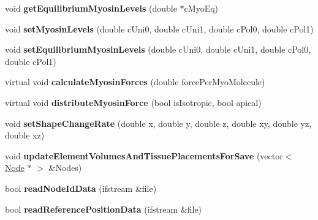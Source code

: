 \begin{DoxyCompactItemize}
\item 
\hypertarget{classShapeBase_ab31ad5e068aeb94f4e851b64d966547a}{}void {\bfseries get\+Equilibrium\+Myosin\+Levels} (double $\ast$c\+Myo\+Eq)\label{classShapeBase_ab31ad5e068aeb94f4e851b64d966547a}

\item 
\hypertarget{classShapeBase_afbcfcd90f0942e917fdc1deb1df1be1c}{}void {\bfseries set\+Myosin\+Levels} (double c\+Uni0, double c\+Uni1, double c\+Pol0, double c\+Pol1)\label{classShapeBase_afbcfcd90f0942e917fdc1deb1df1be1c}

\item 
\hypertarget{classShapeBase_adef29b02faa010719b0810d3643c6b62}{}void {\bfseries set\+Equilibrium\+Myosin\+Levels} (double c\+Uni0, double c\+Uni1, double c\+Pol0, double c\+Pol1)\label{classShapeBase_adef29b02faa010719b0810d3643c6b62}

\item 
\hypertarget{classShapeBase_ac4bc4f757144dc10e6c3170e23c30af0}{}virtual void {\bfseries calculate\+Myosin\+Forces} (double force\+Per\+Myo\+Molecule)\label{classShapeBase_ac4bc4f757144dc10e6c3170e23c30af0}

\item 
\hypertarget{classShapeBase_a62661832529c1556931dea66adfd7ef9}{}virtual void {\bfseries distribute\+Myosin\+Force} (bool is\+Isotropic, bool apical)\label{classShapeBase_a62661832529c1556931dea66adfd7ef9}

\item 
\hypertarget{classShapeBase_a8a9f91384133d8953dbb38d71cc29d51}{}void {\bfseries set\+Shape\+Change\+Rate} (double x, double y, double z, double xy, double yz, double xz)\label{classShapeBase_a8a9f91384133d8953dbb38d71cc29d51}

\item 
\hypertarget{classShapeBase_a6e36c21c648f06a0e0693b3c34472fe5}{}void {\bfseries update\+Element\+Volumes\+And\+Tissue\+Placements\+For\+Save} (vector$<$ \hyperlink{classNode}{Node} $\ast$ $>$ \&Nodes)\label{classShapeBase_a6e36c21c648f06a0e0693b3c34472fe5}

\item 
\hypertarget{classShapeBase_acbd21b1daca4a94c5919147ae8c463d6}{}bool {\bfseries read\+Node\+Id\+Data} (ifstream \&file)\label{classShapeBase_acbd21b1daca4a94c5919147ae8c463d6}

\item 
\hypertarget{classShapeBase_a37a16216b042486dfdcbb16d8366eb7f}{}bool {\bfseries read\+Reference\+Position\+Data} (ifstream \&file)\label{classShapeBase_a37a16216b042486dfdcbb16d8366eb7f}


\end{DoxyCompactItemize}
